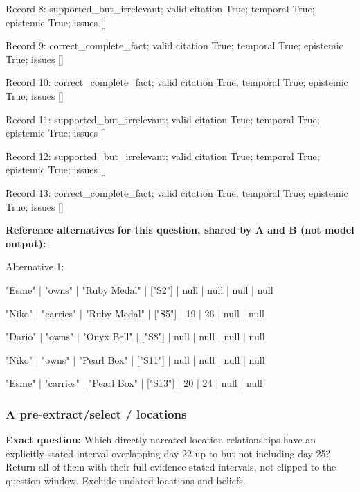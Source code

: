 Record 8: supported\_but\_irrelevant; valid citation True; temporal True; epistemic True; issues []\par

Record 9: correct\_complete\_fact; valid citation True; temporal True; epistemic True; issues []\par

Record 10: correct\_complete\_fact; valid citation True; temporal True; epistemic True; issues []\par

Record 11: supported\_but\_irrelevant; valid citation True; temporal True; epistemic True; issues []\par

Record 12: supported\_but\_irrelevant; valid citation True; temporal True; epistemic True; issues []\par

Record 13: correct\_complete\_fact; valid citation True; temporal True; epistemic True; issues []\par

\noindent\textbf{Reference alternatives for this question, shared by A and B (not model output):}

\noindent Alternative 1:

"Esme" | "owns" | "Ruby Medal" | ["S2"] | null | null | null | null\par\smallskip

"Niko" | "carries" | "Ruby Medal" | ["S5"] | 19 | 26 | null | null\par\smallskip

"Dario" | "owns" | "Onyx Bell" | ["S8"] | null | null | null | null\par\smallskip

"Niko" | "owns" | "Pearl Box" | ["S11"] | null | null | null | null\par\smallskip

"Esme" | "carries" | "Pearl Box" | ["S13"] | 20 | 24 | null | null\par\smallskip

\subsubsection*{A pre-extract/select / locations}

\noindent\textbf{Exact question:} Which directly narrated location relationships have an explicitly stated interval overlapping day 22 up to but not including day 25? Return all of them with their full evidence-stated intervals, not clipped to the question window. Exclude undated locations and beliefs.\par

